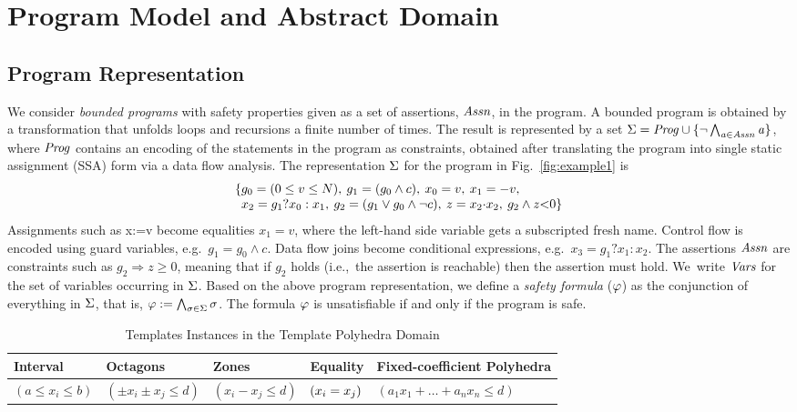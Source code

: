 \section{Program Model and Abstract Domain}\label{sec:domains}
\subsection{Program Representation}\label{sec:program}  
%
We consider \emph{bounded programs} with safety
properties given as a set of assertions, $\assertions$, in the program.
%
A bounded program is obtained by a transformation that unfolds
loops and recursions a finite number of times. The result 
is represented by a set
$\constraints=\program\cup\{\neg \bigwedge_{\assertion\in\assertions} \assertion\}$,
where $\program$ contains an encoding of the statements in the program as
constraints, obtained after translating the program
into single static assignment (SSA) form via a data flow analysis.
%
The representation $\constraints$ for the program in Fig.~\ref{fig:example1} is 
%
\begin{equation}\label{eq:ssa}
\begin{array}{l@{}l}
\{ & g_0 = (0 \leq v \leq N),\:
     g_1 = (g_0 \wedge c),\:
     x_0 = v,\:
     x_1 = -v, \\ 
  &  x_2 = g_1?x_0:x_1, \:
     g_2 = (g_1 \vee g_0\wedge \neg c), \:
     z  = x_2{\cdot}x_2,\:
     g_2 \wedge z{<}0 \}
\end{array}
\end{equation}
%
Assignments such as x:=v become equalities $x_1=v$, where the
left-hand side variable gets a subscripted fresh name.
%
Control flow is encoded using guard variables, e.g.~$g_1=g_0\wedge c$.
%
Data flow joins become conditional expressions, e.g.~$x_3=g_1?x_1:x_2$.
%
The assertions $\assertions$ are constraints such as $g_2
\Rightarrow z\geq 0$, meaning that if $g_2$ holds
(i.e.,~the assertion is reachable) then the assertion must hold.
%
We~write $\vars$ for the set of variables occurring in $\constraints$.  
Based on the above program representation, we define a \textit{safety formula}
($\formula$) as the conjunction of everything in $\constraints$, that is,  
$\formula:= \bigwedge_{\constraint\in\constraints} \constraint$. The formula 
$\formula$ is unsatisfiable if and only if the program is safe.
%
\begin{table}[t]
\small
\begin{center}
{
\begin{tabular}{l|l|l|l|l}
\hline
Interval & Octagons & Zones & Equality & Fixed-coefficient Polyhedra \\ \hline
$(a \leq x_i \leq b)$ & $(\pm x_i \pm x_j \leq d)$ & $(x_i - x_j \leq d)$ & 
  $(x_i=x_j)\Omit{,(x_i \neq x_j)}$ & $(a_1x_1 + \ldots + a_nx_n \leq d)$ \\ 
\hline
\end{tabular}
}
\end{center}
\caption{Templates Instances in the Template Polyhedra Domain}
\label{domain}
\end{table}
%

